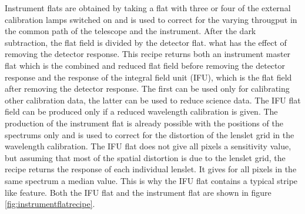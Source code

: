\documentclass[twoside,single]{lion-msc}
\begin{document}
Instrument flats are obtained by taking a flat with three or four of the external calibration lamps switched on and is used to correct for the varying througput in the common path of the telescope and the instrument. After the dark subtraction, the flat field is divided by the detector flat. what has the effect of removing the detector response. This recipe returns both an instrument master flat which is the combined and reduced flat field before removing the detector response and the response of the integral field unit (IFU), which is the flat field after removing the detector response. The first can be used only for calibrating other calibration data, the latter can be used to reduce science data. The IFU flat field can be produced only if a reduced wavelength calibration is given. The production of the instrument flat is already possible with the positions of the spectrums only and is used to correct for the distortion of the lenslet grid in the wavelength calibration. The IFU flat does not give all pixels a sensitivity value, but assuming that most of the spatial distortion is due to the lenslet grid, the recipe returns the response of each individual lenslet. It gives for all pixels in the same spectrum a median value. This is why the IFU flat contains a typical stripe like feature. Both the IFU flat and the instrument flat are shown in figure \ref{fig:instrumentflatrecipe}. 
\end{document}
